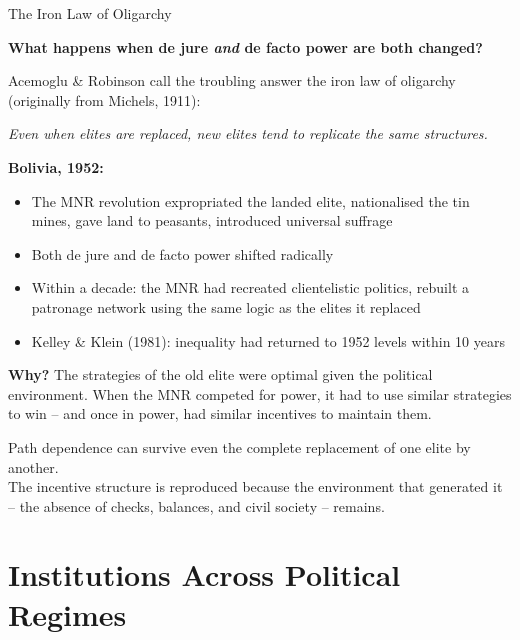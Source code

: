 \documentclass[10pt]{beamer}
\begin{document}
\begin{frame}[allowframebreaks]{The Iron Law of Oligarchy}

\textbf{What happens when de jure \emph{and} de facto power are both changed?}


Acemoglu \& Robinson call the troubling answer the \alert{iron law of oligarchy} (originally from Michels, 1911):


\emph{Even when elites are replaced, new elites tend to replicate the same structures.}


\textbf{Bolivia, 1952:}
\begin{itemize}
\item The MNR revolution expropriated the landed elite, nationalised the tin mines, gave land to peasants, introduced universal suffrage
\item Both de jure and de facto power shifted radically
\item Within a decade: the MNR had recreated clientelistic politics, rebuilt a patronage network using the same logic as the elites it replaced
\item Kelley \& Klein (1981): inequality had returned to 1952 levels within 10 years
\end{itemize}


\textbf{Why?} The strategies of the old elite were optimal given the political environment. When the MNR competed for power, it had to use similar strategies to win -- and once in power, had similar incentives to maintain them.


\alert{Path dependence can survive even the complete replacement of one elite by another.}\\[4pt]
The incentive structure is reproduced because the environment that generated it -- the absence of checks, balances, and civil society -- remains.
\end{frame}


\section{Institutions Across Political Regimes}
\end{document}
